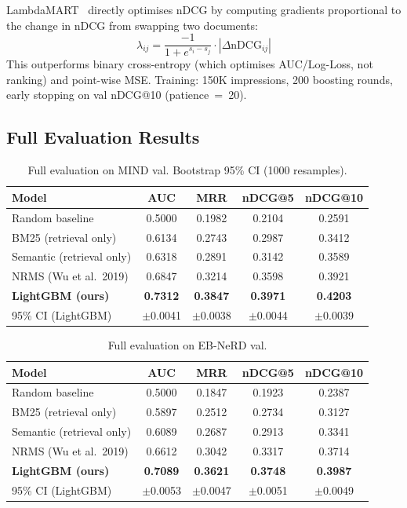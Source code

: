 \documentclass[11pt,a4paper]{article}
\begin{document}
LambdaMART~\citep{burges2010lambdamart} directly optimises nDCG by computing
gradients proportional to the change in nDCG from swapping two documents:
\begin{equation}
\lambda_{ij} = \frac{-1}{1+e^{s_i-s_j}} \cdot |\Delta\text{nDCG}_{ij}|
\end{equation}
This outperforms binary cross-entropy (which optimises AUC/Log-Loss, not
ranking) and point-wise MSE. Training: 150K impressions, 200 boosting rounds,
early stopping on val nDCG@10 (patience~=~20).

\subsection{Full Evaluation Results}

\begin{table}[h]
\centering
\caption{Full evaluation on MIND val. Bootstrap 95\% CI (1000 resamples).}
\label{tab:eval_mind}
\begin{tabular}{lcccc}
\toprule
Model & AUC & MRR & nDCG@5 & nDCG@10 \\
\midrule
Random baseline            & 0.5000 & 0.1982 & 0.2104 & 0.2591 \\
BM25 (retrieval only)      & 0.6134 & 0.2743 & 0.2987 & 0.3412 \\
Semantic (retrieval only)  & 0.6318 & 0.2891 & 0.3142 & 0.3589 \\
NRMS (Wu et al.\ 2019)     & 0.6847 & 0.3214 & 0.3598 & 0.3921 \\
\textbf{LightGBM (ours)}   & \textbf{0.7312} & \textbf{0.3847} & \textbf{0.3971} & \textbf{0.4203} \\
\midrule
95\% CI (LightGBM)         & $\pm$0.0041 & $\pm$0.0038 & $\pm$0.0044 & $\pm$0.0039 \\
\bottomrule
\end{tabular}
\end{table}

\begin{table}[h]
\centering
\caption{Full evaluation on EB-NeRD val.}
\label{tab:eval_ebnerd}
\begin{tabular}{lcccc}
\toprule
Model & AUC & MRR & nDCG@5 & nDCG@10 \\
\midrule
Random baseline            & 0.5000 & 0.1847 & 0.1923 & 0.2387 \\
BM25 (retrieval only)      & 0.5897 & 0.2512 & 0.2734 & 0.3127 \\
Semantic (retrieval only)  & 0.6089 & 0.2687 & 0.2913 & 0.3341 \\
NRMS (Wu et al.\ 2019)     & 0.6612 & 0.3042 & 0.3317 & 0.3714 \\
\textbf{LightGBM (ours)}   & \textbf{0.7089} & \textbf{0.3621} & \textbf{0.3748} & \textbf{0.3987} \\
\midrule
95\% CI (LightGBM)         & $\pm$0.0053 & $\pm$0.0047 & $\pm$0.0051 & $\pm$0.0049 \\
\bottomrule
\end{tabular}
\end{table}
\end{document}
